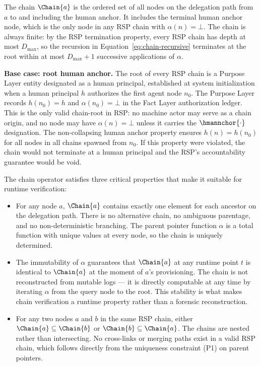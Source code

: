 The chain $\Chain{a}$ is the ordered set of all nodes on the delegation path from $a$ to and including the human anchor. It includes the terminal human anchor node, which is the only node in any RSP chain with $\alpha(n) = \bot$. The chain is always finite: by the RSP termination property, every RSP chain has depth at most $D_{\max}$, so the recursion in Equation~\ref{eq:chain-recursive} terminates at the root within at most $D_{\max} + 1$ successive applications of $\alpha$.

\bigskip
\noindent\textbf{Base case: root human anchor.} The root of every RSP chain is a Purpose Layer entity designated as a human principal, established at system initialization when a human principal $h$ authorizes the first agent node $n_0$. The Purpose Layer records $h(n_0) = h$ and $\alpha(n_0) = \bot$ in the Fact Layer authorization ledger. This is the only valid chain-root in RSP: no machine actor may serve as a chain origin, and no node may have $\alpha(n) = \bot$ unless it carries the $\hmannchor{\cdot}$ designation. The non-collapsing human anchor property ensures $h(n) = h(n_0)$ for all nodes in all chains spawned from $n_0$. If this property were violated, the chain would not terminate at a human principal and the RSP's accountability guarantee would be void.

The chain operator satisfies three critical properties that make it suitable for runtime verification:

\begin{itemize}
    \item[(C1) \textbf{Determinism}] For any node $a$, $\Chain{a}$ contains exactly one element for each ancestor on the delegation path. There is no alternative chain, no ambiguous parentage, and no non-deterministic branching. The parent pointer function $\alpha$ is a total function with unique values at every node, so the chain is uniquely determined.

    \item[(C2) \textbf{Stability}] The immutability of $\alpha$ guarantees that $\Chain{a}$ at any runtime point $t$ is identical to $\Chain{a}$ at the moment of $a$'s provisioning. The chain is not reconstructed from mutable logs --- it is directly computable at any time by iterating $\alpha$ from the query node to the root. This stability is what makes chain verification a runtime property rather than a forensic reconstruction.

    \item[(C3) \textbf{Compositionality}] For any two nodes $a$ and $b$ in the same RSP chain, either $\Chain{a} \subseteq \Chain{b}$ or $\Chain{b} \subseteq \Chain{a}$. The chains are nested rather than intersecting. No cross-links or merging paths exist in a valid RSP chain, which follows directly from the uniqueness constraint (P1) on parent pointers.
\end{itemize}

